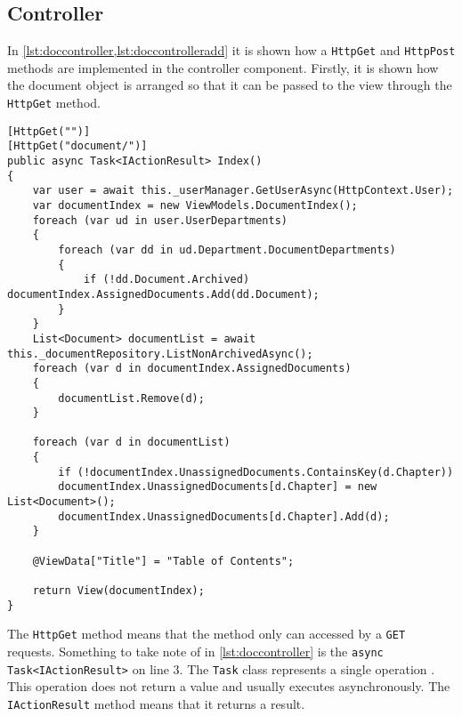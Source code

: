 \subsection{Controller}

In \cref{lst:doccontroller,lst:doccontrolleradd} it is shown how a \texttt{HttpGet} and \texttt{HttpPost} methods are implemented in the controller component.
Firstly, it is shown how the document object is arranged so that it can be passed to the view through the \texttt{HttpGet} method.
\\

\begin{lstlisting}[caption={Document Controller: Index}, label={lst:doccontroller}]
[HttpGet("")]
[HttpGet("document/")]
public async Task<IActionResult> Index()
{
	var user = await this._userManager.GetUserAsync(HttpContext.User);
	var documentIndex = new ViewModels.DocumentIndex();
	foreach (var ud in user.UserDepartments)
	{
		foreach (var dd in ud.Department.DocumentDepartments)
		{
			if (!dd.Document.Archived) documentIndex.AssignedDocuments.Add(dd.Document);
		}
	}
	List<Document> documentList = await this._documentRepository.ListNonArchivedAsync();
	foreach (var d in documentIndex.AssignedDocuments)
	{
		documentList.Remove(d);
	}

	foreach (var d in documentList)
	{
		if (!documentIndex.UnassignedDocuments.ContainsKey(d.Chapter))
		documentIndex.UnassignedDocuments[d.Chapter] = new List<Document>();
		documentIndex.UnassignedDocuments[d.Chapter].Add(d);
	}

	@ViewData["Title"] = "Table of Contents";

	return View(documentIndex);
}
\end{lstlisting}

The \texttt{HttpGet} method means that the method only can accessed by a \texttt{GET} requests.
Something to take note of in \cref{lst:doccontroller} is the \texttt{async Task<IActionResult>} on line 3.
The \texttt{Task} class represents a single operation \cite{microsoft}.
This operation does not return a value and usually executes asynchronously.
The \texttt{IActionResult} method means that it returns a result.

